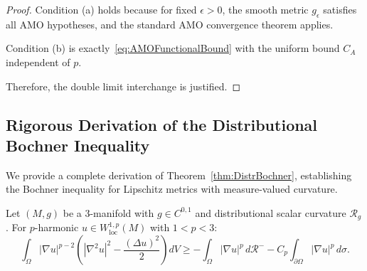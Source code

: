 \begin{proof}
Condition (a) holds because for fixed $\epsilon > 0$, the smooth metric $g_\epsilon$ satisfies all AMO hypotheses, and the standard AMO convergence theorem applies.

Condition (b) is exactly~\eqref{eq:AMOFunctionalBound} with the uniform bound $C_A$ independent of $p$.

Therefore, the double limit interchange is justified.
\end{proof}

\subsection{Rigorous Derivation of the Distributional Bochner Inequality}\label{app:BochnerDerivation}

We provide a complete derivation of Theorem~\ref{thm:DistrBochner}, establishing the Bochner inequality for Lipschitz metrics with measure-valued curvature.

\begin{theorem}\label{thm:BochnerComplete}
Let $(M, g)$ be a 3-manifold with $g \in C^{0,1}$ and distributional scalar curvature $\mathcal{R}_g$. For $p$-harmonic $u \in W^{1,p}_{\mathrm{loc}}(M)$ with $1 < p < 3$:
\begin{equation}\label{eq:BochnerInequality}
    \int_\Omega |\nabla u|^{p-2} \left( |\nabla^2 u|^2 - \frac{(\Delta u)^2}{2} \right) dV \ge -\int_\Omega |\nabla u|^p \, d\mathcal{R}^- - C_p \int_{\partial\Omega} |\nabla u|^p \, d\sigma.
\end{equation}
\end{theorem}

